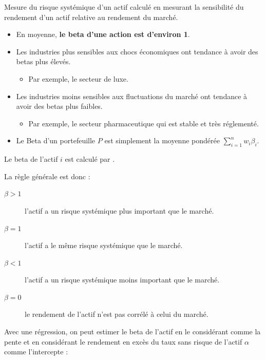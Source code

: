 \documentclass[10pt, french]{article}
\begin{document}
\begin{multicols*}{2}
\begin{definitionNOHFILLsub}
Mesure du risque systémique d'un actif calculé en mesurant la sensibilité du rendement d'un actif relative au rendement du marché.
\begin{itemize}
	\item	En moyenne, \textbf{le beta d'une action est d'environ 1}.
	\item	Les industries plus sensibles aux chocs économiques ont tendance à avoir des betas plus élevés.
		\begin{itemize}
		\item	 Par exemple, le secteur de luxe.
		\end{itemize}
	\item	Les industries moins sensibles aux fluctuations du marché ont tendance à avoir des betas plus faibles.
		\begin{itemize}
		\item	Par exemple, le secteur pharmaceutique qui est stable et très réglementé.
		\end{itemize}
	\item	Le Beta d'un portefeuille $P$ est simplement la moyenne pondérée $\sum_{i = 1}^{n} w_{i} \beta_{i}$.
\end{itemize}

\tcbline

Le beta de l'actif $i$ est calculé par .

La règle générale est donc :
\begin{description}
	\item[$\beta > 1$]	l'actif a un risque systémique plus important que le marché.
	\item[$\beta = 1$]	l'actif a le même risque systémique que le marché.
	\item[$\beta < 1$]	l'actif a un risque systémique moins important que le marché.
	\item[$\beta = 0$]	le rendement de l'actif n'est pas corrélé à celui du marché.
\end{description}
\end{definitionNOHFILLsub}

Avec une régression, on peut estimer le beta de l'actif en le considérant comme la pente et en considérant le rendement en excès du taux sans risque de l'actif $\alpha$ comme l'intercepte :
\begin{center}


\end{center}
\end{multicols*}
\end{document}
